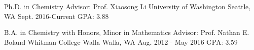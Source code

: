 


\begin{cventries}


\cventry
{Ph.D. in Chemistry \newline
Advisor: Prof. Xiaosong Li}%
{University of Washington} %
{Seattle, WA\vspace{-0.5cm}} %
{Sept. 2016-Current} %
{GPA: 3.88} %



\cventry
{B.A. in Chemistry with Honors, Minor in Mathematics \newline
Advisor: Prof. Nathan E. Boland}%
{Whitman College} %
{Walla Walla, WA} %
{Aug. 2012 - May 2016} %
{GPA: 3.59} %


\end{cventries}
